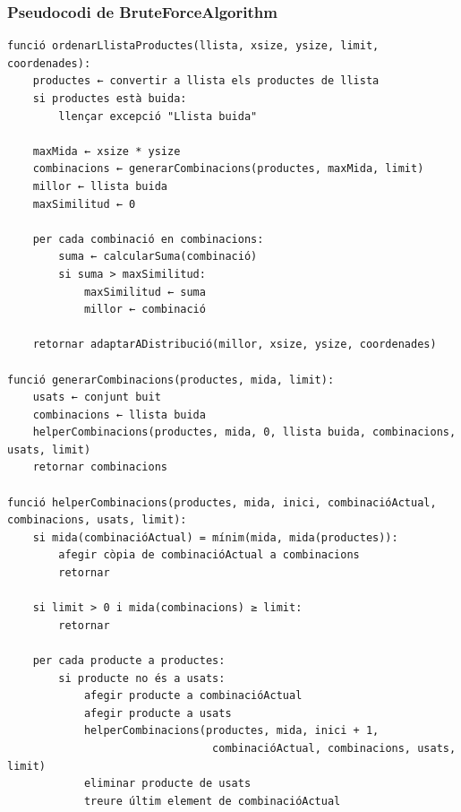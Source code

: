 \documentclass[a4paper, t]{article}
\begin{document}
\subsubsection{Pseudocodi de BruteForceAlgorithm}
\begin{verbatim}
funció ordenarLlistaProductes(llista, xsize, ysize, limit, coordenades):
    productes ← convertir a llista els productes de llista
    si productes està buida:
        llençar excepció "Llista buida"

    maxMida ← xsize * ysize
    combinacions ← generarCombinacions(productes, maxMida, limit)
    millor ← llista buida
    maxSimilitud ← 0

    per cada combinació en combinacions:
        suma ← calcularSuma(combinació)
        si suma > maxSimilitud:
            maxSimilitud ← suma
            millor ← combinació

    retornar adaptarADistribució(millor, xsize, ysize, coordenades)

funció generarCombinacions(productes, mida, limit):
    usats ← conjunt buit
    combinacions ← llista buida
    helperCombinacions(productes, mida, 0, llista buida, combinacions, usats, limit)
    retornar combinacions

funció helperCombinacions(productes, mida, inici, combinacióActual, combinacions, usats, limit):
    si mida(combinacióActual) = mínim(mida, mida(productes)):
        afegir còpia de combinacióActual a combinacions
        retornar

    si limit > 0 i mida(combinacions) ≥ limit:
        retornar

    per cada producte a productes:
        si producte no és a usats:
            afegir producte a combinacióActual
            afegir producte a usats
            helperCombinacions(productes, mida, inici + 1, 
                                combinacióActual, combinacions, usats, limit)
            eliminar producte de usats
            treure últim element de combinacióActual
\end{verbatim}

\newpage
\end{document}
